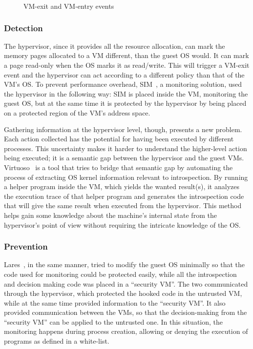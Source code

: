 \begin{figure}[ht]
	\centering
	
	\caption{VM-exit and VM-entry events}
	\label{fig:vmevents}
\end{figure}

\subsubsection{Detection}

The hypervisor, since it provides all the resource allocation, can mark the memory pages allocated to a \ac{VM} different, than the guest \ac{OS} would. It can mark a page read-only when the \ac{OS} marks it as read/write. This will trigger a \ac{VM}-exit event and the hypervisor can act according to a different policy than that of the \ac{VM}’s \ac{OS}. To prevent performance overhead, SIM~\cite{sharif2009secure}, a monitoring solution,  used the hypervisor in the following way: SIM is placed inside the \ac{VM}, monitoring the guest \ac{OS}, but at the same time it is protected by the hypervisor by being placed on a protected region of the \ac{VM}’s address space. 

\par Gathering information at the hypervisor level, though, presents a new problem. Each action collected has the potential for having been executed by different processes. This uncertainty makes it harder to understand the higher-level action being executed; it is a semantic gap between the hypervisor and the guest \ac{VM}s. Virtuoso~\cite{dolan2011virtuoso} is a tool that tries to bridge that semantic gap by automating the process of extracting \ac{OS} kernel information relevant to introspection. By running a helper program inside the \ac{VM}, which yields the wanted result(s), it analyzes the execution trace of that helper program and generates the introspection code that will give the same result when executed from the hypervisor. This method helps gain some knowledge about the machine's internal state from the hypervisor’s point of view without requiring the intricate knowledge of the \ac{OS}. 

\subsubsection{Prevention}

Lares~\cite{payne2008lares}, in the same manner, tried to modify the guest \ac{OS} minimally so that the code used for monitoring could be protected easily, while all the introspection and decision making code was placed in a ``security \ac{VM}''. The two communicated through the hypervisor, which protected the hooked code in the untrusted \ac{VM}, while at the same time provided information to the ``security \ac{VM}''. It also provided communication between the \ac{VM}s, so that the decision-making from the ``security \ac{VM}'' can be applied to the untrusted one. In this situation, the monitoring happens during process creation, allowing or denying the execution of programs as defined in a white-list.

